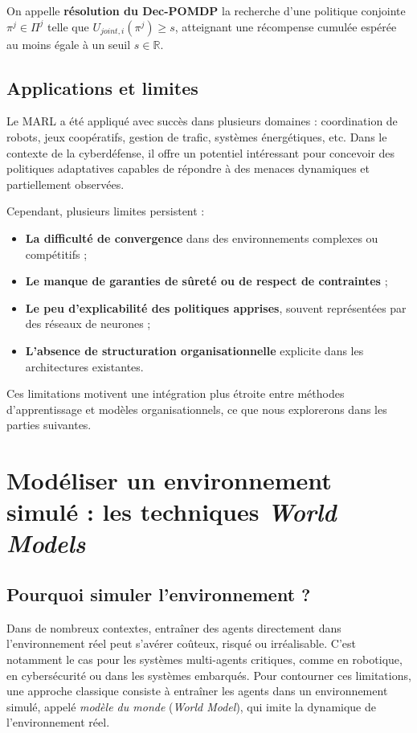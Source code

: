 On appelle \textbf{résolution du \ac{Dec-POMDP}} la recherche d'une politique conjointe $\pi^j \in \Pi^j$ telle que $U_{joint,i}(\pi^j) \geq s$, atteignant une récompense cumulée espérée au moins égale à un seuil $s \in \mathbb{R}$.


\subsection{Applications et limites}

Le \ac{MARL} a été appliqué avec succès dans plusieurs domaines : coordination de robots, jeux coopératifs, gestion de trafic, systèmes énergétiques, etc. Dans le contexte de la cyberdéfense, il offre un potentiel intéressant pour concevoir des politiques adaptatives capables de répondre à des menaces dynamiques et partiellement observées.

Cependant, plusieurs limites persistent :
\begin{itemize}
    \item \textbf{La difficulté de convergence} dans des environnements complexes ou compétitifs ;
    \item \textbf{Le manque de garanties de sûreté ou de respect de contraintes} ;
    \item \textbf{Le peu d'explicabilité des politiques apprises}, souvent représentées par des réseaux de neurones ;
    \item \textbf{L'absence de structuration organisationnelle} explicite dans les architectures existantes.
\end{itemize}

Ces limitations motivent une intégration plus étroite entre méthodes d'apprentissage et modèles organisationnels, ce que nous explorerons dans les parties suivantes.


\section{Modéliser un environnement simulé : les techniques \textit{World Models}}


\subsection{Pourquoi simuler l'environnement ?}

Dans de nombreux contextes, entraîner des agents directement dans l'environnement réel peut s'avérer coûteux, risqué ou irréalisable. C'est notamment le cas pour les systèmes multi-agents critiques, comme en robotique, en cybersécurité ou dans les systèmes embarqués. Pour contourner ces limitations, une approche classique consiste à entraîner les agents dans un environnement simulé, appelé \textit{modèle du monde} (\textit{World Model}), qui imite la dynamique de l'environnement réel.

